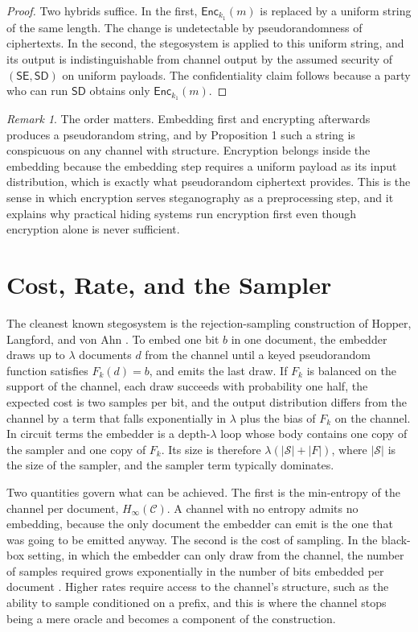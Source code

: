 \documentclass[11pt]{article}
\theoremstyle{definition}
\theoremstyle{remark}
\newtheorem{remark}{Remark}
\newcommand{\Enc}{\mathsf{Enc}}
\newcommand{\SE}{\mathsf{SE}}
\newcommand{\SD}{\mathsf{SD}}
\newcommand{\Hmin}{H_{\infty}}
\begin{document}
\begin{proof}
Two hybrids suffice. In the first, $\Enc_{k_1}(m)$ is replaced by a uniform string of the same length. The change is undetectable by pseudorandomness of ciphertexts. In the second, the stegosystem is applied to this uniform string, and its output is indistinguishable from channel output by the assumed security of $(\SE,\SD)$ on uniform payloads. The confidentiality claim follows because a party who can run $\SD$ obtains only $\Enc_{k_1}(m)$.
\end{proof}

\begin{remark}
The order matters. Embedding first and encrypting afterwards produces a pseudorandom string, and by Proposition 1 such a string is conspicuous on any channel with structure. Encryption belongs inside the embedding because the embedding step requires a uniform payload as its input distribution, which is exactly what pseudorandom ciphertext provides. This is the sense in which encryption serves steganography as a preprocessing step, and it explains why practical hiding systems run encryption first even though encryption alone is never sufficient.
\end{remark}

\section{Cost, Rate, and the Sampler}

The cleanest known stegosystem is the rejection-sampling construction of Hopper, Langford, and von Ahn \cite{hopper2002}. To embed one bit $b$ in one document, the embedder draws up to $\lambda$ documents $d$ from the channel until a keyed pseudorandom function satisfies $F_k(d)=b$, and emits the last draw. If $F_k$ is balanced on the support of the channel, each draw succeeds with probability one half, the expected cost is two samples per bit, and the output distribution differs from the channel by a term that falls exponentially in $\lambda$ plus the bias of $F_k$ on the channel. In circuit terms the embedder is a depth-$\lambda$ loop whose body contains one copy of the sampler and one copy of $F_k$. Its size is therefore $\lambda(|\mathcal{S}|+|F|)$, where $|\mathcal{S}|$ is the size of the sampler, and the sampler term typically dominates.

Two quantities govern what can be achieved. The first is the min-entropy of the channel per document, $\Hmin(\mathcal{C})$. A channel with no entropy admits no embedding, because the only document the embedder can emit is the one that was going to be emitted anyway. The second is the cost of sampling. In the black-box setting, in which the embedder can only draw from the channel, the number of samples required grows exponentially in the number of bits embedded per document \cite{dedic2009}. Higher rates require access to the channel's structure, such as the ability to sample conditioned on a prefix, and this is where the channel stops being a mere oracle and becomes a component of the construction.
\end{document}
